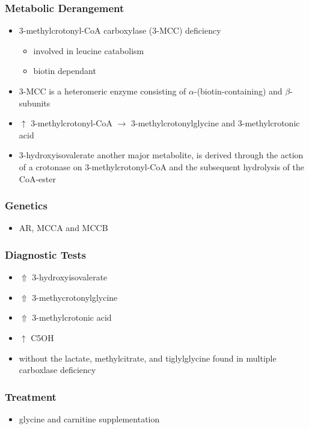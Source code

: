 \documentclass{scrartcl}
\begin{document}
\subsubsection{Metabolic Derangement}
\label{sec:org919163f}
\begin{itemize}
\item 3-methylcrotonyl-CoA carboxylase (3-MCC) deficiency
\begin{itemize}
\item involved in leucine catabolism
\item biotin dependant
\end{itemize}
\item 3-MCC is a heteromeric enzyme consisting of
\(\alpha\)-(biotin-containing) and \(\beta\)-subunits
\item \(\uparrow\) 3-methylcrotonyl-CoA \(\to\) 3-methylcrotonylglycine and
3-methylcrotonic acid
\item 3-hydroxyisovalerate another major metabolite, is derived
through the action of a crotonase on 3-methylcrotonyl-CoA and the
subsequent hydrolysis of the CoA-ester
\end{itemize}
\subsubsection{Genetics}
\label{sec:org839b075}
\begin{itemize}
\item AR, MCCA and MCCB
\end{itemize}
\subsubsection{Diagnostic Tests}
\label{sec:org9157e54}
\begin{itemize}
\item \(\Uparrow\) 3-hydroxyisovalerate
\item \(\Uparrow\) 3-methycrotonylglycine
\item \(\Uparrow\) 3-methylcrotonic acid
\item \(\uparrow\) C5OH
\item without the lactate, methylcitrate, and tiglylglycine found in
multiple carboxlase deficiency
\end{itemize}

\subsubsection{Treatment}
\label{sec:orga33e6c0}
\begin{itemize}
\item glycine and carnitine supplementation
\end{itemize}
\end{document}
